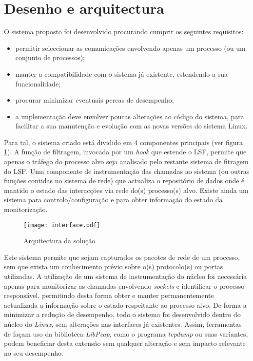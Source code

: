 \section{Desenho e arquitectura}
\label{sec:architecture}

O sistema proposto foi desenvolvido procurando cumprir os seguintes requisitos:
\begin{itemize}
\item permitir seleccionar as comunicações envolvendo apenas um processo (ou um conjunto de processos);
\item manter a compatibilidade com o sistema já existente, estendendo a sua funcionalidade;
\item procurar minimizar eventuais percas de desempenho;
\item a implementação deve envolver poucas alterações ao código do sistema, para facilitar a sua manutenção e evolução com as novas versões do sistema Linux.
\end{itemize}

Para tal, o sistema criado está dividido em 4 componentes principais (ver figura \ref{arquitectura}). A função de filtragem, invocada por um \textit{hook} que estende o LSF, permite que apenas o tráfego do processo alvo seja analisado pelo restante sistema de fitragem do LSF. Uma componente de instrumentação das chamadas ao sistema (ou outras funções contidas no sistema de rede) que actualiza o repositório de dados onde é mantido o estado das interacções via rede do(s) processo(s) alvo. Existe ainda um sistema para controlo/configuração e para obter informação do estado da monitorização.

\begin{figure}[htbp]
\begin{center}
\texttt{[image: interface.pdf]} 
\caption{Arquitectura da solução}
\label{arquitectura}
\end{center}
\end{figure}


Este sistema permite que sejam capturados os pacotes de rede de um processo, sem que exista um conhecimento prévio sobre o(s) protocolo(s) ou portas utilizadas. A utilização de um sistema de instrumentação do núcleo foi necessária apenas para monitorizar as chamadas envolvendo \emph{sockets} e identificar o processo responsável, permitindo desta forma obter e manter permanentemente actualizada a informação sobre o estado respeitante ao processo alvo. De forma a minimizar a redução de desempenho, todo o sistema foi desenvolvido dentro do núcleo do \textit{Linux}, sem alterações nas interfaces já existentes.  Assim, ferramentas de façam uso da biblioteca \textit{LibPcap}, como o programa \textit{tcpdump} ou suas variantes, podem beneficiar desta extensão sem qualquer alteração e sem impacto relevante no seu desempenho.

